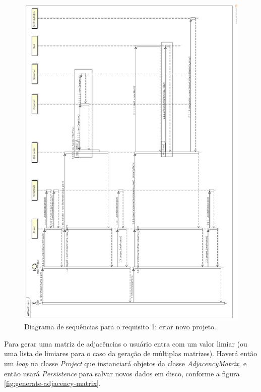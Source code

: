 \begin{figure}
\centering
\includegraphics[scale=0.27]{new-project}
\caption{Diagrama de sequências para o requisito 1: criar novo projeto.}
\label{fig:new-project}
\end{figure}

Para gerar uma matriz de adjacências o usuário entra com um valor limiar (ou uma lista de limiares para o caso da geração de múltiplas matrizes). Haverá
então um \textit{loop} na classe \textit{Project} que instanciará objetos da classe \textit{AdjacencyMatrix}, e então usará \textit{Persistence} para salvar
novos dados em disco, conforme a figura \ref{fig:generate-adjacency-matrix}. \newline

